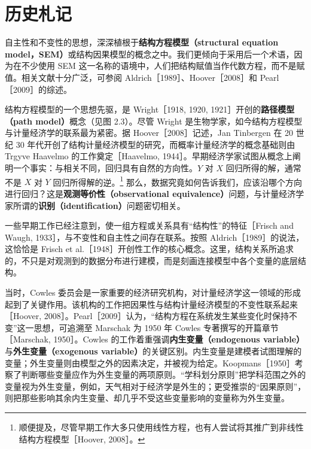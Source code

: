 \section{历史札记}
\label{sec:historical-notes}

自主性和不变性的思想，深深植根于\textbf{结构方程模型（structural equation model，SEM）}或结构因果模型的概念之中。我们更倾向于采用后一个术语，因为在不少使用 SEM 这一名称的语境中，人们把结构赋值当作代数方程，而不是赋值。相关文献十分广泛，可参阅 Aldrich［1989］、Hoover［2008］和 Pearl［2009］的综述。

结构方程模型的一个思想先驱，是 Wright［1918, 1920, 1921］开创的\textbf{路径模型（path model）}概念（见图 2.3）。尽管 Wright 是生物学家，如今结构方程模型与计量经济学的联系最为紧密。据 Hoover［2008］记述，Jan Tinbergen 在 20 世纪 30 年代开创了结构计量经济模型的研究，而概率计量经济学的概念基础则由 Trgyve Haavelmo 的工作奠定［Haavelmo, 1944］。早期经济学家试图从概念上阐明一个事实：与相关不同，回归具有自然的方向性。$Y$ 对 $X$ 回归所得的解，通常不是 $X$ 对 $Y$ 回归所得解的逆。\footnote{顺便提及，尽管早期工作大多只使用线性方程，也有人尝试将其推广到非线性结构方程模型［Hoover, 2008］。}
那么，数据究竟如何告诉我们，应该沿哪个方向进行回归？这是\textbf{观测等价性（observational equivalence）}问题，与计量经济学家所谓的\textbf{识别（identification）}问题密切相关。



一些早期工作已经注意到，使一组方程或关系具有“结构性”的特征［Frisch and Waugh, 1933］，与不变性和自主性之间存在联系。按照 Aldrich［1989］的说法，这恰恰是 Frisch et al.［1948］开创性工作的核心概念。这里，结构关系所追求的，不只是对观测到的数据分布进行建模，而是刻画连接模型中各个变量的底层结构。

当时，Cowles 委员会是一家重要的经济研究机构，对计量经济学这一领域的形成起到了关键作用。该机构的工作把因果性与结构计量经济模型的不变性联系起来［Hoover, 2008］。Pearl［2009］认为，“结构方程在系统发生某些变化时保持不变”这一思想，可追溯至 Marschak 为 1950 年 Cowles 专著撰写的开篇章节［Marschak, 1950］。Cowles 的工作着重强调\textbf{内生变量（endogenous variable）}与\textbf{外生变量（exogenous variable）}的关键区别。内生变量是建模者试图理解的变量；外生变量则由模型之外的因素决定，并被视为给定。Koopmans［1950］考察了判断哪些变量应作为外生变量的两项原则。“学科划分原则”把学科范围之外的变量视为外生变量，例如，天气相对于经济学是外生的；更受推崇的“因果原则”，则把那些影响其余内生变量、却几乎不受这些变量影响的变量称为外生变量。

